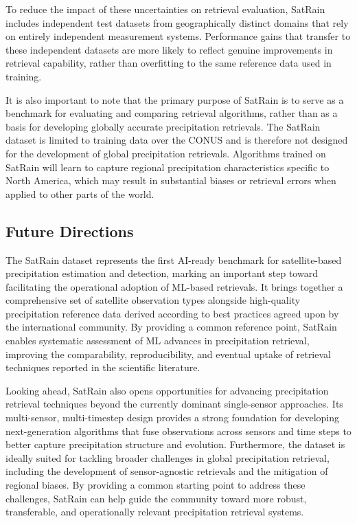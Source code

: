 \documentclass[11pt]{article}
\begin{document}
To reduce the impact of these uncertainties on retrieval evaluation, SatRain
includes independent test datasets from geographically distinct domains that
rely on entirely independent measurement systems. Performance gains that
transfer to these independent datasets are more likely to reflect genuine
improvements in retrieval capability, rather than overfitting to the same
reference data used in training.

It is also important to note that the primary purpose of SatRain is to serve as
a benchmark for evaluating and comparing retrieval algorithms, rather than as a
basis for developing globally accurate precipitation retrievals. The SatRain
dataset is limited to training data over the CONUS and is therefore not designed
for the development of global precipitation retrievals. Algorithms trained on
SatRain will learn to capture regional precipitation characteristics specific to
North America, which may result in substantial biases or retrieval errors when
applied to other parts of the world.

\subsection{Future Directions}

The SatRain dataset represents the first AI-ready benchmark for satellite-based
precipitation estimation and detection, marking an important step toward
facilitating the operational adoption of ML-based retrievals. It
brings together a comprehensive set of satellite observation types alongside
high-quality precipitation reference data derived according to best practices
agreed upon by the international community. By providing a common reference
point, SatRain enables systematic assessment of ML advances in
precipitation retrieval, improving the comparability, reproducibility, and
eventual uptake of retrieval techniques reported in the scientific literature.

Looking ahead, SatRain also opens opportunities for advancing precipitation
retrieval techniques beyond the currently dominant single-sensor approaches. Its
multi-sensor, multi-timestep design provides a strong foundation for developing
next-generation algorithms that fuse observations across sensors and time steps
to better capture precipitation structure and evolution. Furthermore, the
dataset is ideally suited for tackling broader challenges in global
precipitation retrieval, including the development of sensor-agnostic retrievals
and the mitigation of regional biases. By providing a common starting point to
address these challenges, SatRain can help guide the community toward more
robust, transferable, and operationally relevant precipitation retrieval
systems.
\end{document}
